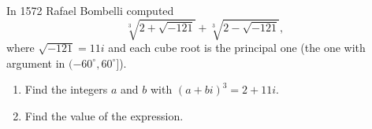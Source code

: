 In 1572 Rafael Bombelli computed
\[\sqrt[3]{2+\sqrt{-121}}+\sqrt[3]{2-\sqrt{-121}},\]
where $\sqrt{-121}=11i$ and each cube root is the principal one (the one with argument in $(-60^\circ,60^\circ]$).
\begin{enumerate}
\item[(a)] Find the integers $a$ and $b$ with $(a+bi)^3=2+11i$.
\item[(b)] Find the value of the expression.
\end{enumerate}
